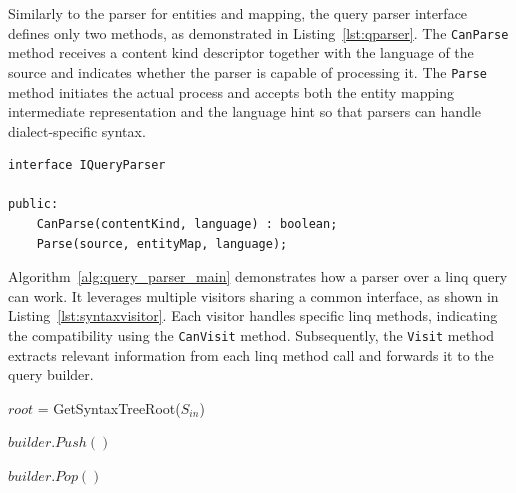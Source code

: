 Similarly to the parser for entities and mapping, the query parser interface defines only two methods, as demonstrated in Listing~\ref{lst:qparser}. The \texttt{CanParse} method receives a content kind descriptor together with the language of the source and indicates whether the parser is capable of processing it. The \texttt{Parse} method initiates the actual process and accepts both the entity mapping intermediate representation and the language hint so that parsers can handle dialect-specific syntax.

 \begin{lstlisting}[caption={IQueryParser interface structure}, language=pseudo, label={lst:qparser}]
interface IQueryParser

public:
    CanParse(contentKind, language) : boolean;
    Parse(source, entityMap, language);
 \end{lstlisting}

Algorithm~\ref{alg:query_parser_main} demonstrates how a parser over a \acrshort{linq} query can work. It leverages multiple visitors sharing a common interface, as shown in Listing~\ref{lst:syntaxvisitor}. Each visitor handles specific \acrshort{linq} methods, indicating the compatibility using the \texttt{CanVisit} method. Subsequently, the \texttt{Visit} method extracts relevant information from each \acrshort{linq} method call and forwards it to the query builder.

\begin{algorithm}[!htp]
    \footnotesize
    \DontPrintSemicolon


    
    $root$ = GetSyntaxTreeRoot($S_{in}$)\;

    $builder.Push()$\;

    \BlankLine
    $builder.Pop()$\;
    
    \caption{\acrshort{linq} query parser}
    \label{alg:query_parser_main}
\end{algorithm}

